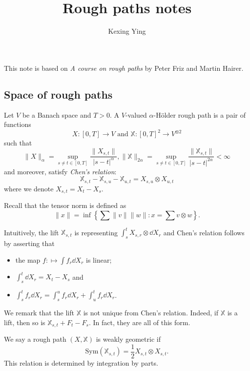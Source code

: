 \documentclass[]{article}
\theoremstyle{definition}
\theoremstyle{definition}
\begin{document}
\title{Rough paths notes}
\author{Kexing Ying}
\maketitle

This note is based on \textit{A course on rough paths} by Peter Friz and Martin Hairer. 

\subsection*{Space of rough paths}

Let \(V\) be a Banach space and \(T > 0\). A \(V\)-valued \(\alpha\)-H\"older rough path is a pair of functions
\[X : [0, T] \to V \text{ and } \mathbb{X} : [0, T]^2 \to V^{\otimes 2}\]
such that 
\[\|X\|_\alpha = \sup_{s \neq t \in [0, T]}\frac{\|X_{s, t}\|}{|s - t|^\alpha}, 
  \|\mathbb{X}\|_{2\alpha} = \sup_{s \neq t \in [0, T]} \frac{\|\mathbb{X}_{s, t}\|}{|s - t|^{2\alpha}} < \infty\]
and moreover, satisfy \textit{Chen's relation}:
\begin{equation}\label{eq:chen}
  \mathbb{X}_{s, t} - \mathbb{X}_{s, u} - \mathbb{X}_{u, t} = X_{s, u} \otimes X_{u, t}
\end{equation}
where we denote \(X_{s, t} = X_t - X_s\).

Recall that the tensor norm is defined as 
\[\|x\| = \inf \left\{\sum \|v\|\|w\| : x = \sum v \otimes w\right\}.\]

Intuitively, the lift \(\mathbb{X}_{s, t}\) is representing \(\int_s^t X_{s, r} \otimes \dd X_r\) and 
Chen's relation follows by asserting that 
\begin{itemize}
  \item the map \(f : \mapsto \int f_r \dd X_r\) is linear;
  \item \(\int_s^t \dd X_r = X_t - X_s\) and
  \item \(\int_s^t f_r \dd X_r = \int_s^u f_r \dd X_r + \int_u^t f_r \dd X_r\).
\end{itemize}

We remark that the lift \(\mathbb{X}\) is not unique from Chen's relation. Indeed, if \(\mathbb{X}\) is a lift, 
then so is \(\mathbb{X}_{s, t} + F_t - F_s\). In fact, they are all of this form. 

We say a rough path \((X, \mathbb{X})\) is weakly geometric if 
\[\text{Sym}(\mathbb{X}_{s, t}) = \frac{1}{2}X_{s, t} \otimes X_{s, t}.\]
This relation is determined by integration by parts.
\end{document}
